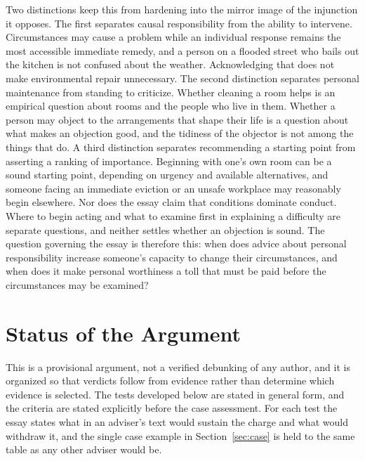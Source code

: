 \documentclass[12pt]{article}
\begin{document}
Two distinctions keep this from hardening into the mirror image of the injunction it opposes. The first separates causal responsibility from the ability to intervene. Circumstances may cause a problem while an individual response remains the most accessible immediate remedy, and a person on a flooded street who bails out the kitchen is not confused about the weather. Acknowledging that does not make environmental repair unnecessary. The second distinction separates personal maintenance from standing to criticize. Whether cleaning a room helps is an empirical question about rooms and the people who live in them. Whether a person may object to the arrangements that shape their life is a question about what makes an objection good, and the tidiness of the objector is not among the things that do. A third distinction separates recommending a starting point from asserting a ranking of importance. Beginning with one's own room can be a sound starting point, depending on urgency and available alternatives, and someone facing an immediate eviction or an unsafe workplace may reasonably begin elsewhere. Nor does the essay claim that conditions dominate conduct. Where to begin acting and what to examine first in explaining a difficulty are separate questions, and neither settles whether an objection is sound. The question governing the essay is therefore this: when does advice about personal responsibility increase someone's capacity to change their circumstances, and when does it make personal worthiness a toll that must be paid before the circumstances may be examined?

\section{Status of the Argument}\label{sec:status}

This is a provisional argument, not a verified debunking of any author, and it is organized so that verdicts follow from evidence rather than determine which evidence is selected. The tests developed below are stated in general form, and the criteria are stated explicitly before the case assessment. For each test the essay states what in an adviser's text would sustain the charge and what would withdraw it, and the single case example in Section~\ref{sec:case} is held to the same table as any other adviser would be.
\end{document}
